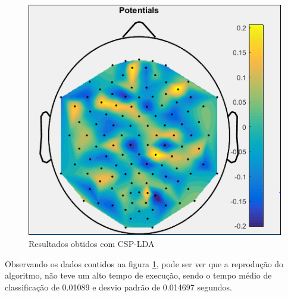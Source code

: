 \pagebreak
\begin{figure}[h]
	\centering
	\includegraphics[keepaspectratio=true,scale=0.5]{figuras/image_csp_matlab.PNG}
	\caption{Resultados obtidos  com CSP-LDA}
	\label{resultadoLotte}
\end{figure}

Observando os dados contidos na figura \ref{resultadoLotte}, pode ser ver que a reprodução do algoritmo, não teve um alto tempo de execução, sendo o tempo médio de classificação de 0.01089 e desvio padrão de 0.014697 segundos. 